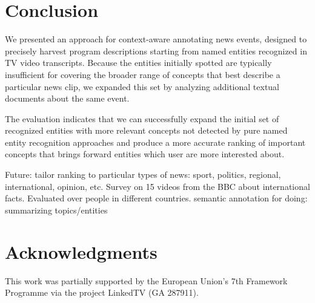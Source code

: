 \documentclass{llncs}
\begin{document}
\section{Conclusion}
\label{sec:Conclusion}
We presented an approach for context-aware annotating news events, designed to precisely harvest program descriptions starting from named entities recognized in TV video transcripts. Because the entities initially spotted are typically insufficient for covering the broader range of concepts that best describe a particular news clip, we expanded this set by analyzing additional textual documents about the same event.

The evaluation indicates that we can successfully expand the initial set of recognized entities with more relevant concepts not detected by pure named entity recognition approaches and produce a more accurate ranking of important concepts that brings forward entities which user are more interested about.

Future: tailor ranking to particular types of news: sport, politics, regional, international, opinion, etc. Survey on 15 videos from the BBC about international facts. Evaluated over people in different countries.
semantic annotation for doing: summarizing topics/entities



\section*{Acknowledgments}
This work was partially supported by the European Union's 7th Framework Programme via the project LinkedTV (GA 287911).



\end{document}
